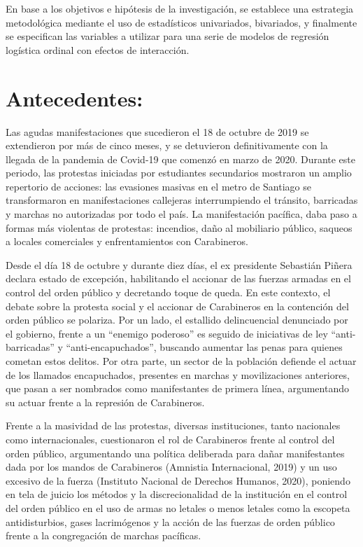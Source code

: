 \documentclass[12pt,twoside]{templates/facsothesis}
\begin{document}
En base a los objetivos e hipótesis de la investigación, se establece una estrategia metodológica mediante el uso de estadísticos univariados, bivariados, y finalmente se especifican las variables a utilizar para una serie de modelos de regresión logística ordinal con efectos de interacción.

\hypertarget{antecedentes}{%
\chapter{Antecedentes:}\label{antecedentes}}

Las agudas manifestaciones que sucedieron el 18 de octubre de 2019 se extendieron por más de cinco meses, y se detuvieron definitivamente con la llegada de la pandemia de Covid-19 que comenzó en marzo de 2020. Durante este periodo, las protestas iniciadas por estudiantes secundarios mostraron un amplio repertorio de acciones: las evasiones masivas en el metro de Santiago se transformaron en manifestaciones callejeras interrumpiendo el tránsito, barricadas y marchas no autorizadas por todo el país. La manifestación pacífica, daba paso a formas más violentas de protestas: incendios, daño al mobiliario público, saqueos a locales comerciales y enfrentamientos con Carabineros.

Desde el día 18 de octubre y durante diez días, el ex presidente Sebastián Piñera declara estado de excepción, habilitando el accionar de las fuerzas armadas en el control del orden público y decretando toque de queda. En este contexto, el debate sobre la protesta social y el accionar de Carabineros en la contención del orden público se polariza. Por un lado, el estallido delincuencial denunciado por el gobierno, frente a un ``enemigo poderoso'' es seguido de iniciativas de ley ``anti-barricadas'' y ``anti-encapuchados'', buscando aumentar las penas para quienes cometan estos delitos. Por otra parte, un sector de la población defiende el actuar de los llamados encapuchados, presentes en marchas y movilizaciones anteriores, que pasan a ser nombrados como manifestantes de primera línea, argumentando su actuar frente a la represión de Carabineros.

Frente a la masividad de las protestas, diversas instituciones, tanto nacionales como internacionales, cuestionaron el rol de Carabineros frente al control del orden público, argumentando una política deliberada para dañar manifestantes dada por los mandos de Carabineros (Amnistia Internacional, 2019) y un uso excesivo de la fuerza (Instituto Nacional de Derechos Humanos, 2020), poniendo en tela de juicio los métodos y la discrecionalidad de la institución en el control del orden público en el uso de armas no letales o menos letales como la escopeta antidisturbios, gases lacrimógenos y la acción de las fuerzas de orden público frente a la congregación de marchas pacíficas.
\end{document}
